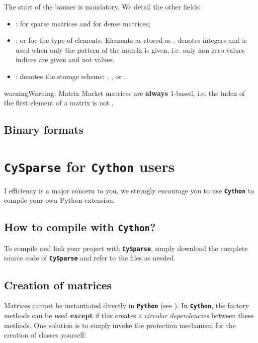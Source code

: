 \documentclass[letterpaper,10pt,english]{sphinxmanual}
\begin{document}
The start of the banner  is mandatory. We detail the other fields:
\begin{itemize}
\item {} 
:  for sparse matrices and  for dense matrices;

\item {} 
:  or  for the type of elements. Elements as stored as .  denotes integers and  is used
when only the pattern of the matrix is given, i.e. only non zero values indices are given and not values.

\item {} 
: denotes the storage scheme: , ,  or .

\end{itemize}

\begin{notice}{warning}{Warning:}
Matrix Market matrices are \textbf{always} 1-based, i.e. the index of the first element of a matrix is  not .
\end{notice}


\section{Binary formats}
\label{io_formats:binary-formats}

\chapter{\textbf{\texttt{CySparse}} for \textbf{\texttt{Cython}} users}
\label{cysparse_cython_users::doc}\label{cysparse_cython_users:cysparse-for-cython-users}
I efficiency is a major concern to you, we strongly encourage you to use \textbf{\texttt{Cython}} to
compile your own Python extension.


\section{How to compile with \textbf{\texttt{Cython}}?}
\label{cysparse_cython_users:how-to-compile-with-cython}
To compile and link your project with \textbf{\texttt{CySparse}}, simply download the complete source code of \textbf{\texttt{CySparse}} and refer to the  files as needed.


\section{Creation of matrices}
\label{cysparse_cython_users:creation-of-matrices}
Matrices cannot be instantiated directly in \textbf{\texttt{Python}} (see {\hyperref[matrix_creation:matrices-must-be-instantiated-by-a-factory-method]{\emph{}}}). In \textbf{\texttt{Cython}}, the factory methods
can be used \textbf{except} if this creates a \emph{circular dependencies} between these methods. One solution is to simply invoke
the protection mechanism for the creation of classes yourself:
\end{document}

